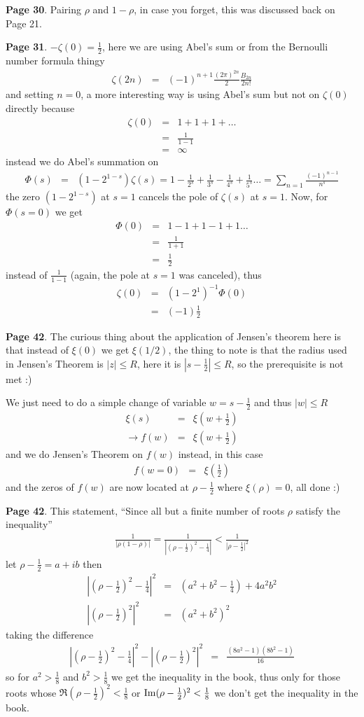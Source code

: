 \documentclass[aps,preprint,preprintnumbers,nofootinbib,showpacs,prd]{revtex4-1}
\newcommand{\nbea}{\begin{eqnarray*}}
\newcommand{\neea}{\end{eqnarray*}}
\def\Im{{\rm Im}}
\begin{document}
{\bf Page 30}. Pairing $\rho$ and $1-\rho$, in case you forget, this was discussed back on Page 21.

{\bf Page 31}. $-\zeta(0) = \frac{1}{2}$, here we are using Abel's sum or from the Bernoulli number formula thingy
%
\nbea
\zeta(2n) & = & (-1)^{n+1} \frac{(2\pi)^{2n}}{2} \frac{B_{2n}}{2n!}
\neea
%
and setting $n = 0$, a more interesting way is using Abel's sum but not on $\zeta(0)$ directly because
%
\nbea
\zeta(0) & = & 1 + 1 + 1 + \dots \\
& = & \frac{1}{1-1} \\
& = & \infty
\neea
%
instead we do Abel's summation on 
%
\nbea
\Phi(s) & = & (1 - 2^{1-s})\zeta(s) = 1 - \frac{1}{2^s} + \frac{1}{3^s} - \frac{1}{4^s} + \frac{1}{5^s} \dots = \sum_{n=1}\frac{(-1)^{n-1}}{n^s}
\neea
%
the zero $(1 - 2^{1-s})$ at $s = 1$ cancels the pole of $\zeta(s)$ at $s=1$. Now, for $\Phi(s=0)$ we get
%
\nbea
\Phi(0) & = & 1 - 1 + 1 - 1 + 1 \dots \\
& = & \frac{1}{1 + 1} \\
& = & \frac{1}{2}
\neea
%
instead of $\frac{1}{1-1}$ (again, the pole at $s = 1$ was canceled), thus
%
\nbea
\zeta(0) & = & (1 - 2^{1})^{-1} \Phi(0) \\
& = & (-1) \frac{1}{2}
\neea
%

{\bf Page 42}. The curious thing about the application of Jensen's theorem here is that instead of $\xi(0)$ we get $\xi(1/2)$, the thing to note is that the radius used in Jensen's Theorem is $|z| \le R$, here it is $|s-\frac{1}{2}| \le R$, so the prerequisite is not met :)

We just need to do a simple change of variable $w = s - \frac{1}{2}$ and thus $|w| \le R$
%
\nbea
\xi(s) & = & \xi(w + \frac{1}{2}) \\
\to f(w) & = & \xi(w + \frac{1}{2})
\neea
%
and we do Jensen's Theorem on $f(w)$ instead, in this case
%
\nbea
f(w = 0) & = & \xi\left(\frac{1}{2}\right)
\neea
%
and the zeros of $f(w)$ are now located at $\rho-\frac{1}{2}$ where $\xi(\rho) = 0$, all done :)

{\bf Page 42}. This statement, ``Since all but a finite number of roots $\rho$ satisfy the inequality''
%
\nbea
\frac{1}{|\rho(1-\rho)|} = \frac{1}{|(\rho-\frac{1}{2})^2 - \frac{1}{4}|} < \frac{1}{|\rho-\frac{1}{2}|^2}
\neea
%
let $\rho - \frac{1}{2} = a + ib$ then
%
\nbea
|(\rho-\frac{1}{2})^2 - \frac{1}{4}|^2 & = & (a^2 + b^2 - \frac{1}{4}) + 4a^2b^2 \\
|(\rho-\frac{1}{2})^2|^2 & = & (a^2 + b^2)^2
\neea
%
taking the difference
%
\nbea
|(\rho-\frac{1}{2})^2 - \frac{1}{4}|^2 - |(\rho-\frac{1}{2})^2|^2 & = & \frac{(8a^2 - 1)(8b^2 - 1)}{16}
\neea
%
so for $a^2 > \frac{1}{8}$ and $b^2 > \frac{1}{8}$ we get the inequality in the book, thus only for those roots whose $\Re(\rho-\frac{1}{2})^2 < \frac{1}{8}$ or $\Im(\rho-\frac{1}{2})^2 < \frac{1}{8}$ we don't get the inequality in the book.
\end{document}
